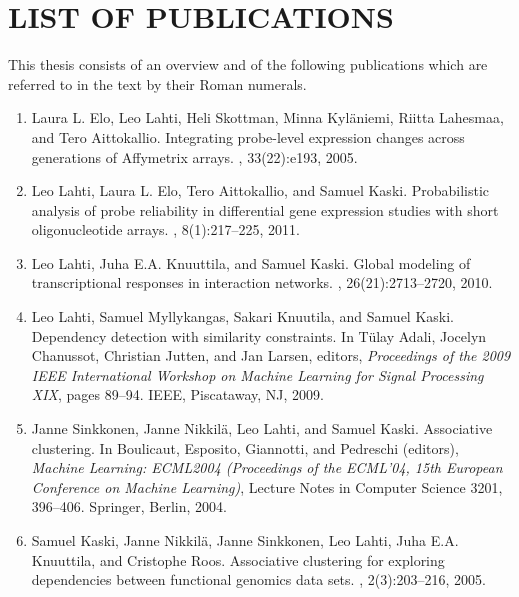 
\section*{LIST OF PUBLICATIONS}
\label{sec:publications}

This thesis consists of an overview and of the following publications
which are referred to in the text by their Roman numerals.


\leftmargini=6mm {\sloppy
\begin{enumerate}
\item Laura L. Elo, Leo Lahti, Heli Skottman, Minna Kyl{\"a}niemi,
  Riitta Lahesmaa, and Tero Aittokallio.  \newblock Integrating
  probe-level expression changes across generations of Affymetrix
  arrays.  , 33(22):e193, 2005.
\label{PECA}

\item Leo Lahti, Laura L. Elo, Tero Aittokallio, and Samuel Kaski.
  \newblock Probabilistic analysis of probe reliability in
  differential gene expression studies with short oligonucleotide
  arrays. , 8(1):217--225, 2011.
\label{RPA}

\item Leo Lahti, Juha E.A. Knuuttila, and Samuel Kaski.
\newblock Global modeling of transcriptional responses in interaction networks.
, 26(21):2713--2720, 2010.
\label{NR}

\item Leo Lahti, Samuel Myllykangas, Sakari Knuutila, and Samuel
  Kaski.  \newblock Dependency detection with similarity constraints.
  \newblock In T{\"u}lay Adali, Jocelyn Chanussot, Christian Jutten,
  and Jan Larsen, editors, {\em Proceedings of the 2009 IEEE
    International Workshop on Machine Learning for Signal Processing
    XIX}, pages 89--94. IEEE, Piscataway, NJ, 2009.  
\label{MLSP}

\item Janne Sinkkonen, Janne Nikkil\"{a}, Leo Lahti, and Samuel Kaski.
  \newblock Associative clustering.  \newblock In Boulicaut, Esposito,
  Giannotti, and Pedreschi (editors), {\em Machine Learning: ECML2004
    (Proceedings of the ECML'04, 15th European Conference on Machine
    Learning)}, Lecture Notes in Computer Science 3201,
  396--406. Springer, Berlin, 2004.  
\label{ECML}

\item
Samuel Kaski, Janne Nikkil{\"a}, Janne Sinkkonen, Leo Lahti, Juha E.A. Knuuttila, and Cristophe Roos.
\newblock Associative clustering for exploring dependencies between functional
  genomics data sets.
, 2(3):203--216, 2005.
\label{AC}


\end{enumerate}}


